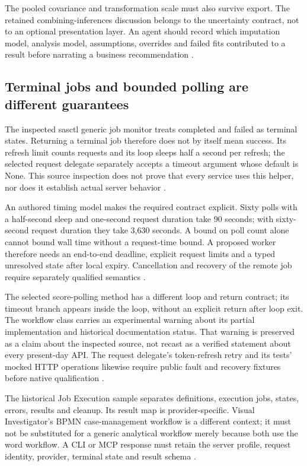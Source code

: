 The pooled covariance and transformation scale must also survive export.
The retained combining-inferences discussion belongs to the uncertainty
contract, not to an optional presentation layer. An agent should record
which imputation model, analysis model, assumptions, overrides and failed
fits contributed to a result before narrating a business recommendation
\citep{exec21_transport_sas_combining,exec21_transport_sas_mianalyze_intro,
exec24_sas_choice}.

\subsection{Terminal jobs and bounded polling are different guarantees}
The inspected sasctl generic job monitor treats completed and failed as
terminal states. Returning a terminal job therefore does not by itself
mean success. Its refresh limit counts requests and its loop sleeps half
a second per refresh; the selected request delegate separately accepts a
timeout argument whose default is None. This source inspection does not
prove that every service uses this helper, nor does it establish actual
server behavior \citep{exec23_workflow_delegates_sasctl}.

An authored timing model makes the required contract explicit. Sixty
polls with a half-second sleep and one-second request duration take
90 seconds; with sixty-second request duration they take 3,630 seconds.
A bound on poll count alone cannot bound wall time without a request-time
bound. A proposed worker therefore needs an end-to-end deadline, explicit
request limits and a typed unresolved state after local expiry. Cancellation
and recovery of the remote job require separately qualified semantics
\citep{exec24_sas_choice}.

The selected score-polling method has a different loop and return contract;
its timeout branch appears inside the loop, without an explicit return
after loop exit. The workflow class carries an experimental warning about
its partial implementation and historical documentation status. That
warning is preserved as a claim about the inspected source, not recast as
a verified statement about every present-day API. The request delegate's
token-refresh retry and its tests' mocked HTTP operations likewise require
public fault and recovery fixtures before native qualification
\citep{exec23_workflow_sasctl,exec23_workflow_delegates_sasctl}.

The historical Job Execution sample separates definitions, execution jobs,
states, errors, results and cleanup. Its result map is provider-specific.
Visual Investigator's BPMN case-management workflow is a different context;
it must not be substituted for a generic analytical workflow merely because
both use the word workflow. A CLI or MCP response must retain the server
profile, request identity, provider, terminal state and result schema
\citep{exec24_workflow_contracts_sas}.

